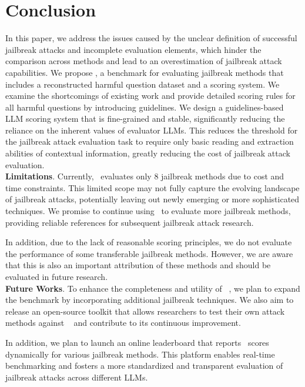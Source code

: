 \section{Conclusion}

In this paper, we address the issues caused by the unclear definition of successful jailbreak attacks and incomplete evaluation elements, which hinder the comparison across methods and lead to an overestimation of jailbreak attack capabilities. We propose \bench, a benchmark for evaluating jailbreak methods that includes a reconstructed harmful question dataset and a scoring system. We examine the shortcomings of existing work and provide detailed scoring rules for all harmful questions by introducing guidelines. We design a guidelines-based LLM scoring system that is fine-grained and stable, significantly reducing the reliance on the inherent values of evaluator LLMs. This reduces the threshold for the jailbreak attack evaluation task to require only basic reading and extraction abilities of contextual information, greatly reducing the cost of jailbreak attack evaluation.\\
\textbf{Limitations}. Currently, \bench~evaluates only 8 jailbreak methods due to cost and time constraints. This limited scope may not fully capture the evolving landscape of jailbreak attacks, potentially leaving out newly emerging or more sophisticated techniques. We promise to continue using \bench~to evaluate more jailbreak methods, providing reliable references for subsequent jailbreak attack research.

In addition, due to the lack of reasonable scoring principles, we do not evaluate the performance of some transferable jailbreak methods. However, we are aware that this is also an important attribution of these methods and should be evaluated in future research.\\
\textbf{Future Works}. To enhance the completeness and utility of \bench~, we plan to expand the benchmark by incorporating additional jailbreak techniques. We also aim to release an open-source toolkit that allows researchers to test their own attack methods against \bench~ and contribute to its continuous improvement.

In addition, we plan to launch an online leaderboard that reports \bench~scores dynamically for various jailbreak methods. This platform enables real-time benchmarking and fosters a more standardized and transparent evaluation of jailbreak attacks across different LLMs.